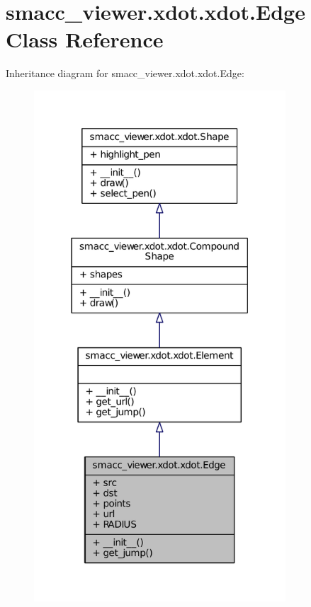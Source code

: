 \hypertarget{classsmacc__viewer_1_1xdot_1_1xdot_1_1Edge}{}\section{smacc\+\_\+viewer.\+xdot.\+xdot.\+Edge Class Reference}
\label{classsmacc__viewer_1_1xdot_1_1xdot_1_1Edge}


Inheritance diagram for smacc\+\_\+viewer.\+xdot.\+xdot.\+Edge\+:
\nopagebreak
\begin{figure}[H]
\begin{center}
\leavevmode
\includegraphics[width=266pt]{classsmacc__viewer_1_1xdot_1_1xdot_1_1Edge__inherit__graph}
\end{center}
\end{figure}


